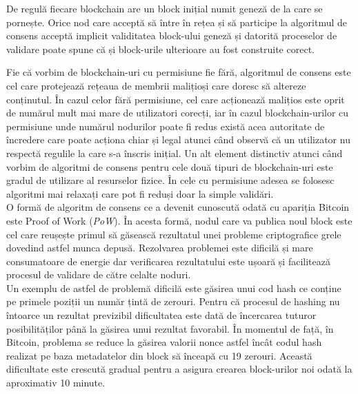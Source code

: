 De regulă fiecare blockchain are un block inițial numit geneză de la care se pornește. Orice nod care acceptă să între în rețea și să participe la algoritmul de consens acceptă implicit validitatea block-ului geneză și datorită proceselor de validare poate spune că și block-urile ulterioare au fost construite corect.\\

\clearpage

Fie că vorbim de blockchain-uri cu permisiune fie fără, algoritmul de consens este cel care protejează rețeaua de membrii malițioși care doresc să altereze conținutul. În cazul celor fără permisiune, cel care acționează malițios este oprit de numărul mult mai mare de utilizatori corecți, iar în cazul blockchain-urilor cu permisiune unde numărul nodurilor poate fi redus există acea autoritate de încredere care poate acționa chiar și legal atunci când observă că un utilizator nu respectă regulile la care s-a înscris inițial. Un alt element distinctiv atunci când vorbim de algoritmi de consens pentru cele două tipuri de blockchain-uri este gradul de utilizare al resurselor fizice. În cele cu permisiune adesea se folosesc algoritmi mai relaxați care pot fi reduși doar la simple validări.\\

O formă de algoritm de consens ce a devenit cunoscută odată cu apariția Bitcoin este Proof of Work (\textit{PoW}). În acesta formă, nodul care va publica noul block este cel care reușește primul să găsească rezultatul unei probleme criptografice grele dovedind astfel munca depusă. Rezolvarea problemei este dificilă și mare consumatoare de energie dar verificarea rezultatului este ușoară și facilitează procesul de validare de către celalte noduri.\\

Un exemplu de astfel de problemă dificilă este găsirea unui cod hash ce conține pe primele poziții un număr țintă de zerouri. Pentru că procesul de hashing nu întoarce un rezultat previzibil dificultatea este dată de încercarea tuturor posibilităților până la găsirea unui rezultat favorabil. În momentul de față, în Bitcoin, problema se reduce la găsirea valorii nonce astfel încât codul hash realizat pe baza metadatelor din block să înceapă cu 19 zerouri. Această dificultate este crescută gradual pentru a asigura crearea block-urilor noi odată la aproximativ 10 minute.\\

